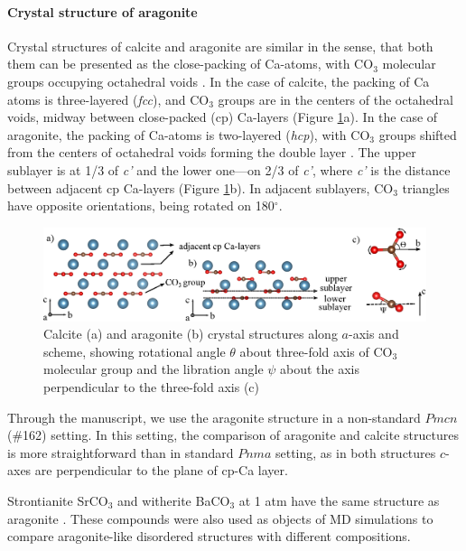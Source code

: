 \documentclass[journal=jacsat,manuscript=article]{achemso}
\begin{document}
	\paragraph{Crystal structure of aragonite}
Crystal structures of calcite and aragonite are similar in the sense, that both them can be presented as the close-packing of Ca-atoms, with CO$_3$ molecular groups occupying octahedral voids \cite{bragg1924}.
In the case of calcite, the packing of Ca atoms is three-layered ({\it fcc}), and CO$_3$ groups are in the centers of the octahedral voids, midway between close-packed (cp) Ca-layers (Figure \ref{str}a).
 In the case of aragonite, the packing of Ca-atoms is two-layered ({\it hcp}), with CO$_3$ groups shifted from the centers of octahedral voids forming the double layer \cite{bragg1924}. 
The upper sublayer is at 1/3 of {\it c'} and the lower one---on 2/3 of {\it c'}, where {\it c'} is the distance between adjacent cp Ca-layers (Figure \ref{str}b). 
In adjacent sublayers, CO$_3$ triangles have opposite orientations, being rotated on 180$^{\circ}$.

\begin{figure}[h]
	\includegraphics[width=\textwidth]{str}
	\caption{Calcite (a) and aragonite (b) crystal structures along $a$-axis and scheme, showing rotational angle  $\theta$ about three-fold axis of CO$_3$ molecular group and the libration angle $\psi$ about the axis perpendicular to the three-fold axis (c)} \label{str}
\end{figure}


Through the manuscript, we use the aragonite structure in a non-standard $Pmcn$ (\#162) setting. 
In this setting, the comparison of aragonite and calcite structures is more straightforward than in standard $Pnma$ setting, as in both structures $c$-axes are perpendicular to the plane of cp-Ca layer.

Strontianite SrCO$_3$ and witherite BaCO$_3$ at 1 atm have the same structure as aragonite \cite{srco3}. 
These compounds were also used as objects of MD simulations to compare aragonite-like disordered structures with different compositions.


\end{document}
